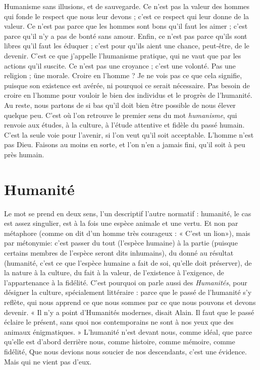 Humanisme sans illusions, et de sauvegarde. Ce n’est pas la valeur des hommes
qui fonde le respect que nous leur devons ; c’est ce respect qui leur donne de la
valeur. Ce n’est pas parce que les hommes sont bons qu’il faut les aimer ; c'est
parce qu’il n’y a pas de bonté sans amour. Enfin, ce n’est pas parce qu’ils sont
libres qu’il faut les éduquer ; c’est pour qu’ils aient une chance, peut-être, de le
devenir. C’est ce que j'appelle l’humanisme pratique, qui ne vaut que par les
actions qu’il suscite. Ce n’est pas une croyance ; c’est une volonté. Pas une
religion ; üne morale. Croire en l’homme ? Je ne vois pas ce que cela signifie,
puisque son existence est avérée, ni pourquoi ce serait nécessaire. Pas besoin de
croire en l’homme pour vouloir le bien des individus et le progrès de l’humanité.
Au reste, nous partons de si bas qu’il doit bien être possible de nous élever
quelque peu. C’est où l’on retrouve le premier sens du mot {\it humanisme}, qui
renvoie aux études, à la culture, à l’étude attentive et fidèle du passé humain.
C’est la seule voie pour l'avenir, si l’on veut qu’il soit acceptable. L'homme
n’est pas Dieu. Faisons au moins en sorte, et l’on n’en a jamais fini, qu’il soit à
peu près humain.

\section{Humanité}
Le mot se prend en deux sens, l’un descriptif l’autre normatif :
humanité, le cas est assez singulier, est à la fois une espèce
animale et une vertu. Et non par métaphore (comme on dit d’un homme très
courageux : « C’est un lion»), mais par métonymie: c’est passer du tout
(l'espèce humaine) à la partie (puisque certains membres de l’espèce seront dits
inhumains), du donné au résultat (humanité, c’est ce que l'espèce humaine a
fait de soi, qu’elle doit préserver), de la nature à la culture, du fait à la valeur,
de l’existence à l’exigence, de l’appartenance à la fidélité. C’est pourquoi on
parle aussi des {\it Humanités}, pour désigner la culture, spécialement littéraire :
parce que le passé de l'humanité s’y reflète, qui nous apprend ce que nous
sommes par ce que nous pouvons et devons devenir. « Il n’y a point d’Humanités
modernes, disait Alain. Il faut que le passé éclaire le présent, sans quoi nos
contemporains ne sont à nos yeux que des animaux énigmatiques. » L’humanité
n’est devant nous, comme idéal, que parce qu’elle est d’abord derrière
nous, comme histoire, comme mémoire, comme fidélité, Que nous devions
nous soucier de nos descendants, c’est une évidence. Mais qui ne vient pas
d’eux.

